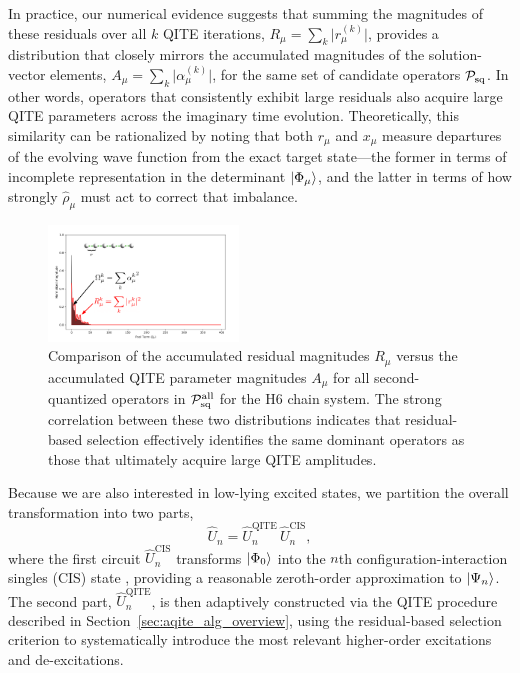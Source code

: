 \documentclass[aip,jcp,amsmath,amssymb, reprint]{revtex4-1}
\begin{document}
In practice, our numerical evidence suggests that summing the magnitudes of these residuals over all $k$ QITE iterations, 
$R_\mu = \sum_{k} \bigl|r_\mu^{(k)}\bigr|$,
provides a distribution that closely mirrors the accumulated magnitudes of the solution-vector elements,
$A_\mu = \sum_{k} \bigl| \alpha_\mu^{(k)}\bigr|$,
for the same set of candidate operators $\mathcal{P}_{\rm{sq}}$. In other words, operators that consistently exhibit large residuals also acquire large QITE parameters across the imaginary time evolution. Theoretically, this similarity can be rationalized by noting that both $r_\mu$ and $x_\mu$ measure departures of the evolving wave function from the exact target state---the former in terms of incomplete representation in the determinant $\ket{\Phi_\mu}$, and the latter in terms of how strongly $\hat{\rho}_\mu$ must act to correct that imbalance.

\begin{figure}[h!]
\centering
\includegraphics[width=0.45\textwidth]{sqite_paper/full_pool_plot.png}
\caption{Comparison of the accumulated residual magnitudes $R_\mu$ versus the accumulated QITE parameter magnitudes $A_\mu$ for all second-quantized operators in $\mathcal{P}_{\rm{sq}}^{\rm{all}}$ for the H6 chain system. The strong correlation between these two distributions indicates that residual-based selection effectively identifies the same dominant operators as those that ultimately acquire large QITE amplitudes.}
\label{fig:residual_param_comparison}
\end{figure}

Because we are also interested in low-lying excited states, we partition the overall transformation into two parts, 
\[
\hat{U}_n = \hat{U}_n^{\mathrm{QITE}} \, \hat{U}_n^{\mathrm{CIS}},
\]
where the first circuit $\hat{U}_n^{\mathrm{CIS}}$ transforms $\ket{\Phi_0}$ into the $n$th configuration-interaction singles (CIS) state \cite{}, providing a reasonable zeroth-order approximation to $\ket{\Psi_n}$. The second part, $\hat{U}_n^{\mathrm{QITE}}$, is then adaptively constructed via the QITE procedure described in Section~\ref{sec:aqite_alg_overview}, using the residual-based selection criterion to systematically introduce the most relevant higher-order excitations and de-excitations.
\end{document}
